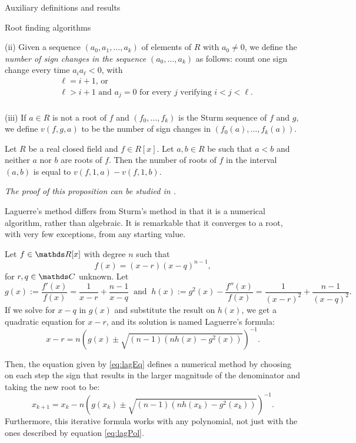 \documentclass[11pt, a4paper, english, twoside, notitlepage, openright]{report}
\begin{document}
\begin{chapter}{Auxiliary definitions and results}
\begin{section}{Root finding algorithms}
\begin{definitions}
(ii) Given a sequence $(a_0, a_1, \dots, a_k)$ of elements of $R$ with $a_0 \ne 0$, we define the \emph{number of sign changes in the sequence} $(a_0, \dots, a_k)$ as follows: count one sign change every time $a_ia_{\ell} < 0$, with 
\begin{equation*}
\begin{aligned}
&\ell = i + 1 \text{, or }\\
&\ell > i + 1 \text{ and } a_j = 0 \text{ for every } j \text{ verifying  } i < j < \ell.\\ 
\end{aligned}
\end{equation*}

(iii) If $a \in R$ is not a root of $f$ and $(f_0, \dots, f_k)$ is the Sturm sequence of $f$ and $g$, we define $v(f, g, a)$ to be the number of sign changes in $(f_0(a), \dots, f_k(a))$.
\end{definitions}
\begin{proposition}\label{sturm} 
Let $R$ be a real closed field and $f \in R[x]$. Let $a, b \in R$ be such that $a < b$ and neither $a$ nor $b$ are roots of $f$. Then the number of roots of $f$ in the interval $(a, b)$ is equal to $v(f, 1, a) - v(f, 1, b)$.

\em The proof of this proposition can be studied in \cite[1.2.10]{bcr}. \em
\end{proposition}

Laguerre's method differs from Sturm's method in that it is a numerical algorithm, rather than algebraic. It is remarkable that it converges to a root, with very few exceptions, from any starting value.

\begin{proposition}\label{laguerre}
Let $f \in \R[x]$ with degree $n$ such that
\begin{equation}\label{eq:lagPol}
	f(x) = (x - r)(x - q)^{n-1},
\end{equation}
for $r, q \in \C$ unknown. Let 
$$
g(x) := \frac{f'(x)}{f(x)} = \frac{1}{x - r} + \frac{n - 1}{x - q} \ \text{ and } \ h(x) := g^2(x) - \frac{f''(x)}{f(x)} = \frac{1}{(x - r)^2} + \frac{n - 1}{(x - q)^2}.
$$
If we solve for $x - q$ in $g(x)$ and substitute the result on $h(x)$, we get a quadratic equation for $x - r$, and its solution is named Laguerre's formula:
\begin{equation}\label{eq:lagEq}
x - r = n \left(g(x) \pm \sqrt{ (n - 1) (n h(x) - g^2(x))} \right)^{-1}.
\end{equation}

Then, the equation given by \ref{eq:lagEq} defines a numerical method by choosing on each step the sign that results in the larger magnitude of the denominator and taking the new root to be:
$$
x_{k+1} = x_k - n \left(g(x_k) \pm \sqrt{ (n - 1) (n h(x_k) - g^2(x_k))} \right)^{-1}.
$$
Furthermore, this iterative formula works with any polynomial, not just with the ones described by equation \ref{eq:lagPol}.
\end{proposition}
\end{section}
\end{chapter}
\end{document}
